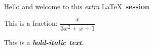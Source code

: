 \documentclass{article}
\def\eq1{\dfrac{x}{3x^2+x+1}}
\newcommand{\boldItalic}[1]{\textbf{\textit{#1}}}
\newcommand{\intro}[2]{Hello and welcome to this \emph{#1} \LaTeX\ \textbf{#2}}
\begin{document}
\intro{extra}{session}

This is a fraction: $\eq1$

This is a \boldItalic{bold-italic text}.
\end{document}
